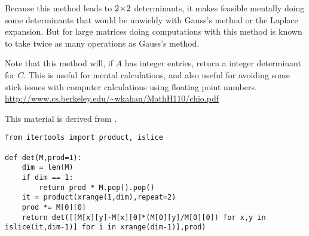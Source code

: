 Because this method leads to $2 \! \times \! 2$ determinants, it makes feasible
mentally doing some determinants that would be unwieldy with Gauss's 
method or the Laplace expansion.
But for large matrices doing computations with this method is 
known to take twice as many operations as Gauss's method.

Note that this method will, if $A$ has integer entries, 
return a integer determinant for $C$.  
This is useful for mental calculations, and also useful for 
avoiding some stick issues with computer calculations using
floating point numbers.
\url{http://www.cs.berkeley.edu/~wkahan/MathH110/chio.pdf} 

This material is derived from \cite{FullerLogan}.

\begin{lstlisting}
from itertools import product, islice

def det(M,prod=1):
    dim = len(M)
    if dim == 1:
        return prod * M.pop().pop()
    it = product(xrange(1,dim),repeat=2)
    prod *= M[0][0]
    return det([[M[x][y]-M[x][0]*(M[0][y]/M[0][0]) for x,y in islice(it,dim-1)] for i in xrange(dim-1)],prod)
\end{lstlisting}

